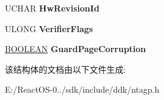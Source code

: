 \begin{DoxyCompactItemize}
U\+C\+H\+AR {\bfseries Hw\+Revision\+Id}
\item 
\mbox{\label{struct___a_g_p___i_n_f_o___c_o_m_m_o_n_a7ba1941588238a309c4a33ab6d4f42f1}} 
U\+L\+O\+NG {\bfseries Verifier\+Flags}
\item 
\mbox{\label{struct___a_g_p___i_n_f_o___c_o_m_m_o_n_a322f433ce74d65d52ecafa696779f4f8}} 
\hyperlink{_processor_bind_8h_a112e3146cb38b6ee95e64d85842e380a}{B\+O\+O\+L\+E\+AN} {\bfseries Guard\+Page\+Corruption}
\end{DoxyCompactItemize}


该结构体的文档由以下文件生成\+:\begin{DoxyCompactItemize}
\item 
E\+:/\+React\+O\+S-\/0../sdk/include/ddk/ntagp.\+h\end{DoxyCompactItemize}
